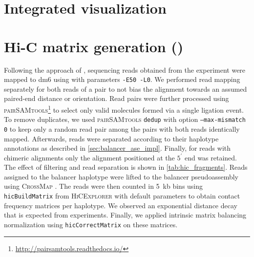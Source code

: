 \section{Integrated visualization}



\FloatBarrier



\section{Hi-C matrix generation (\texorpdfstring{\alek}{Aleksander Jankowski})}
\label{sec:suppl_hic}

Following the approach of \cite{Ramirez2018}, sequencing reads obtained from
the \hic experiment were mapped to \ac{dm6} using \bwamem with parameters
\texttt{-E50 -L0}. We performed read mapping separately for both reads of a pair
to not bias the alignment towards an assumed paired-end distance or orientation.
Read pairs were further processed using \textsc{pairSAMtools}\footnote{\url{http://pairsamtools.readthedocs.io/}}
to select only valid \hic molecules formed via a single ligation event. To
remove \pcr duplicates, we used \textsc{pairSAMtools} \texttt{dedup} with option
\texttt{--max-mismatch 0} to keep only a random read pair among the pairs with
both reads identically mapped. Afterwards, reads were separated according to
their haplotype annotations as described in \cref{sec:balancer_ase_impl}.
Finally, for reads with chimeric alignments only the alignment positioned at the
$5^\prime$ end was retained. The effect of filtering and read separation is
shown in \cref{tab:hic_fragments}. Reads assigned to the balancer haplotype were
lifted to the balancer pseudoassembly using \textsc{CrossMap} \citep{Zhao2014}.
The reads were then counted in 5~kb bins using \texttt{hicBuildMatrix} from
\textsc{HiCExplorer} with default parameters \citep{Ramirez2018} to obtain
contact frequency matrices per haplotype. We observed an exponential distance
decay that is expected from \hic experiments. Finally, we applied intrinsic
matrix balancing normalization using \texttt{hicCorrectMatrix} on these matrices.


